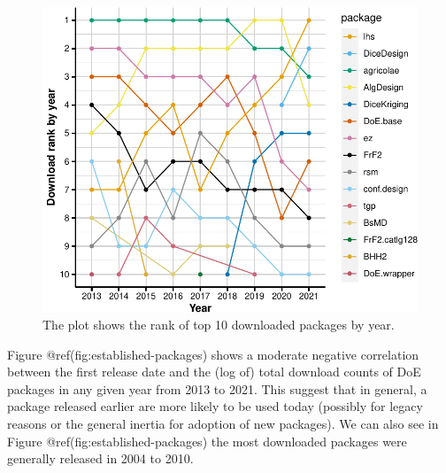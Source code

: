 \documentclass{article}
\begin{document}
\begin{figure}[htbp]

{\centering \includegraphics{figures/rank-over-time-1} 

}

\caption{The plot shows the rank of top 10 downloaded packages by year. }\label{fig:rank-over-time}
\end{figure}

Figure @ref(fig:established-packages) shows a moderate negative
correlation between the first release date and the (log of) total
download counts of DoE packages in any given year from 2013 to 2021.
This suggest that in general, a package released earlier are more likely
to be used today (possibly for legacy reasons or the general inertia for
adoption of new packages). We can also see in Figure
@ref(fig:established-packages) the most downloaded packages were
generally released in 2004 to 2010.
\end{document}
